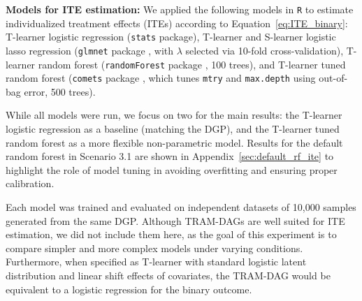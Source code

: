 \textbf{Models for ITE estimation:} We applied the following models in \texttt{R} to estimate individualized treatment effects (ITEs) according to Equation~\ref{eq:ITE_binary}: T-learner logistic regression (\texttt{stats} package), T-learner and S-learner logistic lasso regression (\texttt{glmnet} package \citep{friedman2010}, with $\lambda$ selected via 10-fold cross-validation), T-learner random forest (\texttt{randomForest} package \citep{breiman2001}, 100 trees), and T-learner tuned random forest (\texttt{comets} package \citep{comets}, which tunes \texttt{mtry} and \texttt{max.depth} using out-of-bag error, 500 trees).

While all models were run, we focus on two for the main results: the T-learner logistic regression as a baseline (matching the DGP), and the T-learner tuned random forest as a more flexible non-parametric model. Results for the default random forest in Scenario 3.1 are shown in Appendix~\ref{sec:default_rf_ite} to highlight the role of model tuning in avoiding overfitting and ensuring proper calibration.

Each model was trained and evaluated on independent datasets of 10,000 samples generated from the same DGP. Although TRAM-DAGs are well suited for ITE estimation, we did not include them here, as the goal of this experiment is to compare simpler and more complex models under varying conditions. Furthermore, when specified as T-learner with standard logistic latent distribution and linear shift effects of covariates, the TRAM-DAG would be equivalent to a logistic regression for the binary outcome.
% 
% 
% 
% 

